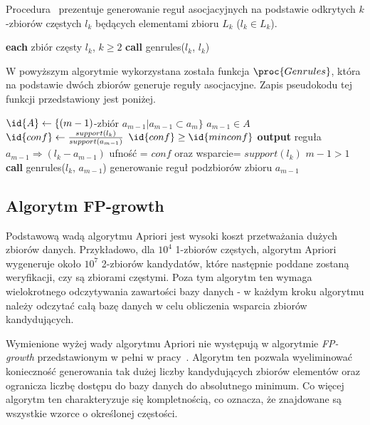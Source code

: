 Procedura~ prezentuje generowanie reguł asocjacyjnych na podstawie odkrytych $k$-zbiorów częstych $l_k$ będących elementami zbioru $L_k$ ($l_k \in L_k$).

\begin{codebox}
		\li \For \textbf{each} zbiór częsty $l_k$, $k \geq 2$ 
		\li \Do
			\textbf{call} genrules($l_k$, $l_k$)
			\End
		\End
\end{codebox}

W powyższym algorytmie wykorzystana została funkcja $\proc{Genrules}$, która na podstawie dwóch zbiorów generuje reguły asocjacyjne. Zapis pseudokodu tej funkcji przedstawiony jest poniżej.

\begin{codebox}
		\li $\id{A} \gets \lbrace (m-1)$-zbiór $a_{m-1} | a_{m-1} \subset a_m \rbrace$
		\li \For $a_{m-1} \in A$
			\li \Do
			$\id{conf} \gets \frac{support(l_k)}{support(a_{m-1})}$
			\li \If $\id{conf} \geq \id{minconf}$
				\li \Then
						\textbf{output} reguła $a_{m-1} \Rightarrow (l_k - a_{m-1})$ \CommentSymbol ufność = $conf$ oraz wsparcie= $support(l_k)$
						\li \If $m-1 > 1$ 
							\li \Then
							\textbf{call} genrules($l_k$, $a_{m-1}$) \CommentSymbol generowanie reguł podzbiorów zbioru $a_{m-1}$
						\End
				\End
			\End
		\End
\end{codebox}

\subsection{Algorytm FP-growth\label{sec:fpgrowth}}

Podstawową wadą algorytmu Apriori jest wysoki koszt przetważania dużych zbiorów danych. Przykładowo, dla $10^4$ 1-zbiorów częstych, algorytm Apriori wygeneruje około $10^7$ 2-zbiorów kandydatów, które następnie poddane zostaną weryfikacji, czy są zbiorami częstymi. Poza tym algorytm ten wymaga wielokrotnego odczytywania zawartości bazy danych - w każdym kroku algorytmu należy odczytać całą bazę danych w celu obliczenia wsparcia zbiorów kandydujących.

Wymienione wyżej wady algorytmu Apriori nie występują w algorytmie \emph{FP-growth} przedstawionym w pełni w pracy~\cite{Main:FPgrowth}. Algorytm ten pozwala wyeliminować konieczność generowania tak dużej liczby kandydujących zbiorów elementów oraz ogranicza liczbę dostępu do bazy danych do absolutnego minimum.  Co więcej algorytm ten charakteryzuje się kompletnością, co oznacza, że znajdowane są wszystkie wzorce o określonej częstości.

